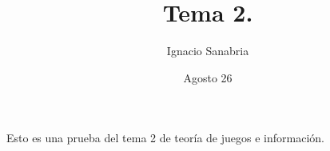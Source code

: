 \documentclass[12pt]{article}
\title{Tema 2. }
\author{Ignacio Sanabria}
\date{Agosto 26}
\begin{document}
\maketitle
Esto es una prueba del tema 2 de teoría de juegos e información. \\\\
\end{document}
